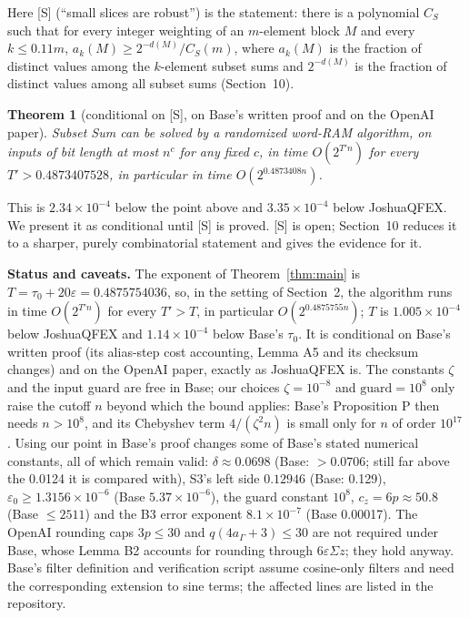 \documentclass[11pt]{article}
\newcommand{\eps}{\varepsilon}
\theoremstyle{plain}
\newtheorem{theorem}{Theorem}
\begin{document}
Here [S] (``small slices are robust'') is the statement: there is a polynomial $C_S$ such that for every integer weighting of an $m$-element block $M$ and every $k \le 0.11m$, $a_k(M) \ge 2^{-d(M)}/C_S(m)$, where $a_k(M)$ is the fraction of distinct values among the $k$-element subset sums and $2^{-d(M)}$ is the fraction of distinct values among all subset sums (Section~10).

\begin{theorem}[conditional on {[S]}, on Base's written proof and on the OpenAI paper]\label{thm:ternary}
Subset Sum can be solved by a randomized word-RAM algorithm, on inputs of bit length at most $n^c$ for any fixed $c$, in time $O(2^{T' n})$ for every $T' > 0.4873407528$, in particular in time $O(2^{0.4873408n})$.
\end{theorem}

This is $2.34\times10^{-4}$ below the point above and $3.35\times10^{-4}$ below JoshuaQFEX. We present it as conditional until [S] is proved. [S] is open; Section~10 reduces it to a sharper, purely combinatorial statement and gives the evidence for it.

\textbf{Status and caveats.} The exponent of Theorem~\ref{thm:main} is $T = \tau_0 + 20\eps = 0.4875754036$, so, in the setting of Section~2, the algorithm runs in time $O(2^{T' n})$ for every $T' > T$, in particular $O(2^{0.4875755n})$; $T$ is $1.005\times10^{-4}$ below JoshuaQFEX and $1.14\times10^{-4}$ below Base's $\tau_0$. It is conditional on Base's written proof (its alias-step cost accounting, Lemma A5 and its checksum changes) and on the OpenAI paper, exactly as JoshuaQFEX is. The constants $\zeta$ and the input guard are free in Base; our choices $\zeta=10^{-8}$ and $\mathrm{guard}=10^8$ only raise the cutoff $n$ beyond which the bound applies: Base's Proposition P then needs $n > 10^8$, and its Chebyshev term $4/(\zeta^2 n)$ is small only for $n$ of order $10^{17}$. Using our point in Base's proof changes some of Base's stated numerical constants, all of which remain valid: $\delta\approx0.0698$ (Base: $> 0.0706$; still far above the 0.0124 it is compared with), S3's left side $0.12946$ (Base: 0.129), $\eps_0 \ge 1.3156\times10^{-6}$ (Base $5.37\times10^{-6}$), the guard constant $10^8$, $c_z = 6p \approx 50.8$ (Base $\le 2511$) and the B3 error exponent $8.1\times10^{-7}$ (Base 0.00017). The OpenAI rounding caps $3p \le 30$ and $q(4a_\Gamma + 3) \le 30$ are not required under Base, whose Lemma B2 accounts for rounding through $6\eps\Sigma z$; they hold anyway. Base's filter definition and verification script assume cosine-only filters and need the corresponding extension to sine terms; the affected lines are listed in the repository.
\end{document}
